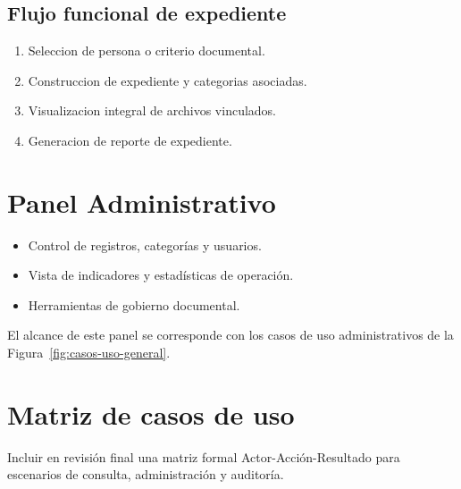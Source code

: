 \subsection{Flujo funcional de expediente}
\begin{enumerate}
  \item Seleccion de persona o criterio documental.
  \item Construccion de expediente y categorias asociadas.
  \item Visualizacion integral de archivos vinculados.
  \item Generacion de reporte de expediente.
\end{enumerate}

\section{Panel Administrativo}
\begin{itemize}
  \item Control de registros, categorías y usuarios.
  \item Vista de indicadores y estadísticas de operación.
  \item Herramientas de gobierno documental.
\end{itemize}
El alcance de este panel se corresponde con los casos de uso administrativos de la Figura~\ref{fig:casos-uso-general}.

\section{Matriz de casos de uso}
Incluir en revisión final una matriz formal Actor-Acción-Resultado para escenarios de consulta, administración y auditoría.
